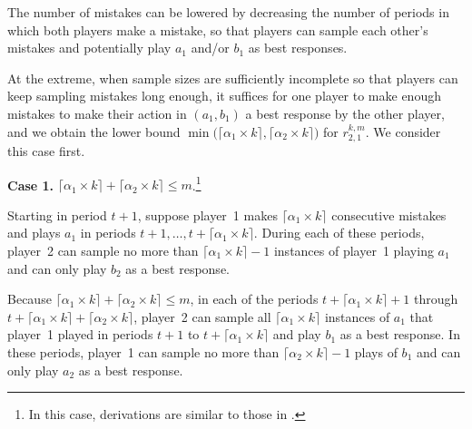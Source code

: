 The number of mistakes can be lowered by decreasing the number of periods in which both players make a mistake, so that players can sample each other's mistakes and potentially play $a_1$ and/or $b_1$ as best responses. 
 
At the extreme, when sample sizes are sufficiently incomplete so that players can keep sampling mistakes long enough, it suffices for one player to make enough mistakes to make their action in $(a_1,b_1)$ a best response by the other player, and we obtain the lower bound $\min\big(\lceil \alpha_1 \times k \rceil,\lceil \alpha_2 \times k \rceil\big)$ for $r_{2,1}^{k,m}$. 
We consider this case first. 

{\bf Case 1.} $\lceil \alpha_1 \times k \rceil + \lceil \alpha_2 \times k \rceil \leq m$.\footnote{In this case, derivations are similar to those in \cite{Young1998}.} 
%

Starting in period $t+1$, suppose player~1 makes $\lceil \alpha_1 \times k \rceil$ consecutive mistakes and plays $a_1$ in periods $t+1, \dots, t+ \lceil \alpha_1 \times k \rceil$. During each of these periods, player~2 can sample no more than $\lceil \alpha_1 \times k \rceil - 1$ instances of player~1 playing $a_1$ and can only play $b_2$ as a best response.

Because $\lceil \alpha_1 \times k \rceil + \lceil \alpha_2 \times k \rceil \leq m$, in each of the periods $t+\lceil \alpha_1 \times k \rceil + 1$ through $t + \lceil \alpha_1 \times k \rceil + \lceil \alpha_2 \times k \rceil$, player~2 can sample all $ \lceil \alpha_1 \times k \rceil $ instances of $a_1$ that player~1 played in periods $t+1$ to $t+\lceil \alpha_1 \times k \rceil$ and play $b_1$ as a best response. In these periods, player~1 can sample no more than $\lceil \alpha_2 \times k \rceil - 1$ plays of $b_1$ and can only play $a_2$ as a best response.

